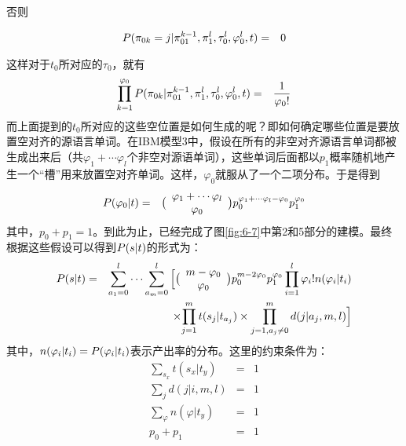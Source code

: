 否则

\begin{eqnarray}
{P}(\pi_{0k}=j|\pi_{01}^{k-1},\pi_1^l,\tau_0^l,\varphi_0^l,{t}) & = & 0
\label{eq:6-14}
\end{eqnarray}

这样对于$t_0$所对应的$\tau_0$，就有
{
\begin{eqnarray}
\prod_{k=1}^{\varphi_0}{{P}(\pi_{0k}|\pi_{01}^{k-1},\pi_{1}^{l},\tau_{0}^{l},\varphi_{0}^{l},{t})         } & = & \frac{1}{\varphi_{0}!}
\label{eq:6-15}
\end{eqnarray}
}
\parinterval 而上面提到的$t_0$所对应的这些空位置是如何生成的呢？即如何确定哪些位置是要放置空对齐的源语言单词。在IBM模型3中，假设在所有的非空对齐源语言单词都被生成出来后（共$\varphi_1+\cdots {\varphi}_l$个非空对源语单词），这些单词后面都以$p_1$概率随机地产生一个“槽”用来放置空对齐单词。这样，${\varphi}_0$就服从了一个二项分布。于是得到
{
\begin{eqnarray}
{P}(\varphi_0|{t}) & = & \big(\begin{array}{c}
\varphi_1+\cdots \varphi_l\\
\varphi_0\\
\end{array}\big)p_0^{\varphi_1+\cdots \varphi_l-\varphi_0}p_1^{\varphi_0}
\label{eq:6-16}
\end{eqnarray}
}
\noindent 其中，$p_0+p_1=1$。到此为止，已经完成了图\ref{fig:6-7}中第2和5部分的建模。最终根据这些假设可以得到${P}({s}| {t})$的形式为：
{
\begin{eqnarray}
{{P}({s}| {t})}&= &{\sum_{a_1=0}^{l}{\cdots}\sum_{a_m=0}^{l}{\Big[\big(\begin{array}{c}
m-\varphi_0\\
\varphi_0\\
\end{array}\big)}p_0^{m-2\varphi_0}p_1^{\varphi_0}\prod_{i=1}^{l}{{\varphi_i}!n(\varphi_i|t_i)    }} \nonumber \\
& & \times{\prod_{j=1}^{m}{t(s_j|t_{a_j})} \times \prod_{j=1,a_j\neq 0}^{m}{d(j|a_j,m,l)}} \Big]
\label{eq:6-17}
\end{eqnarray}
}
\noindent 其中，$n(\varphi_i |t_i)={{P}(\varphi_i|t_i)}$表示产出率的分布。这里的约束条件为：
{
\begin{eqnarray}
\sum_{s_x}t(s_x|t_y)                     & = &1 \label{eq:6-18} \\
\sum_{j}d(j|i,m,l)                & = & 1 \label{eq:6-19} \\
\sum_{\varphi} n(\varphi|t_y) & = &1 \label{eq:6-20} \\
p_0+p_1                            & = & 1 \label{eq:6-21}
\end{eqnarray}
}

